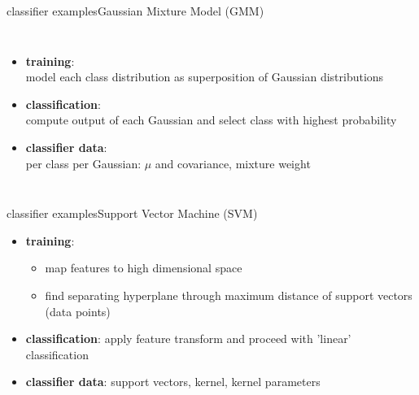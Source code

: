         \begin{frame}{classifier examples}{Gaussian Mixture Model (GMM)}
            \vspace{-5mm}
             \begin{columns}
                   \begin{itemize}
                        \item	\textbf{training}:\\ model each class distribution as superposition of Gaussian distributions
                        \bigskip
                        \item<2->	\textbf{classification}:\\ compute output of each Gaussian and select class with highest probability
                        \bigskip
                        \item<3->	\textbf{classifier data}:\\ per class per Gaussian: $\mu$ and covariance, mixture weight
                    \end{itemize}
                \vspace{-11mm}
            \end{columns}
        \end{frame}
        
        \begin{frame}{classifier examples}{Support Vector Machine (SVM)}
            \begin{itemize}
                \item	\textbf{training}:
                    \begin{itemize}
                        \item   map features to high dimensional space
                        \item   find separating hyperplane through maximum distance of support vectors (data points)
                    \end{itemize}
                \item<2->	\textbf{classification}: apply feature transform and proceed with 'linear' classification
                \item<3->	\textbf{classifier data}: support vectors, kernel, kernel parameters
            \end{itemize}
        \end{frame}
    

